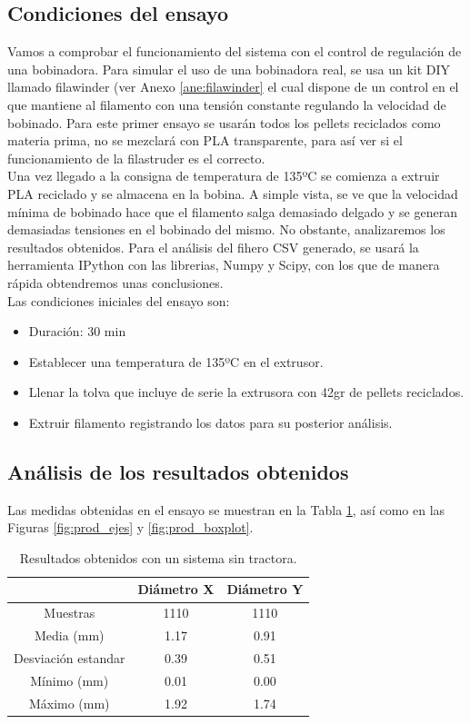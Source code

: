 \subsection{Condiciones del ensayo}

Vamos a comprobar el funcionamiento del sistema con el control de regulación de una bobinadora. Para simular el uso de una bobinadora real, se usa un kit DIY llamado filawinder (ver Anexo \ref{ane:filawinder} el cual dispone de un control en el que mantiene al filamento con una tensión constante regulando la velocidad de bobinado. Para este primer ensayo se usarán todos los pellets reciclados como materia prima, no se mezclará con PLA transparente, para así ver si el funcionamiento de la filastruder es el correcto.\\

Una vez llegado a la consigna de temperatura de 135ºC se comienza a extruir PLA reciclado y se almacena en la bobina. A simple vista, se ve que la velocidad mínima de bobinado hace que el filamento salga demasiado delgado y se generan demasiadas tensiones en el bobinado del mismo. No obstante, analizaremos los resultados obtenidos. Para el análisis del fihero CSV generado, se usará la herramienta IPython con las librerias, Numpy y Scipy, con los que de manera rápida obtendremos unas conclusiones.\\

Las condiciones iniciales del ensayo son:

    \begin{itemize}
        \item {Duración: 30 min}
        \item {Establecer una temperatura de 135ºC en el extrusor.}
        \item {Llenar la tolva que incluye de serie la extrusora con 42gr de pellets reciclados.}
        \item {Extruir filamento registrando los datos para su posterior análisis.}
    \end{itemize}

\subsection{Análisis de los resultados obtenidos}

Las medidas obtenidas en el ensayo se muestran en la Tabla \ref{tab:result1}, así como en las Figuras \ref{fig:prod_ejes} y \ref{fig:prod_boxplot}.

\begin{table}[H]
	\centering
	\begin{tabular}{ccc}
		{\bf } & {\bf Diámetro X} & {\bf Diámetro Y} \\ \hline
		Muestras & 1110 & 1110 \\
		Media (mm) & 1.17 & 0.91 \\
		Desviación estandar & 0.39 & 0.51 \\
		Mínimo (mm) & 0.01 & 0.00 \\
		Máximo (mm) & 1.92 & 1.74
	\end{tabular}
	\caption[Resultados obtenidos con un sistema sin tractora.]{Resultados obtenidos con un sistema sin tractora.}
	\label{tab:result1}
\end{table}

